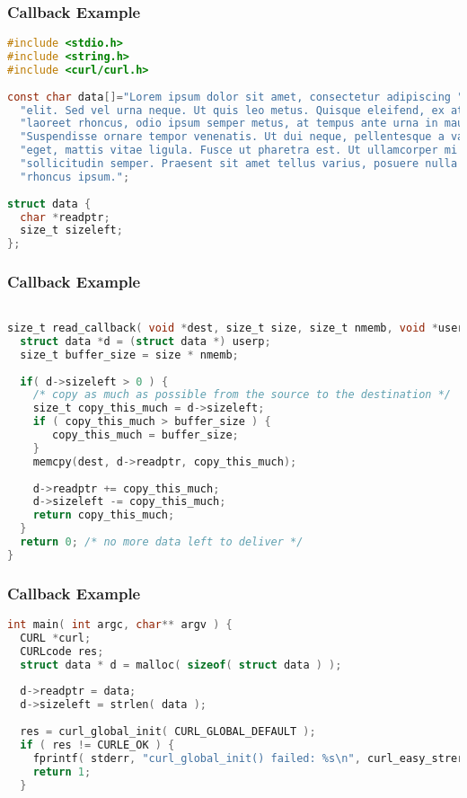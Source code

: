 \begin{frame}[fragile]
	\frametitle{Callback Example}

	\begin{lstlisting}[language=C]
#include <stdio.h>
#include <string.h>
#include <curl/curl.h>
  
const char data[]="Lorem ipsum dolor sit amet, consectetur adipiscing "
  "elit. Sed vel urna neque. Ut quis leo metus. Quisque eleifend, ex at "
  "laoreet rhoncus, odio ipsum semper metus, at tempus ante urna in mauris. "
  "Suspendisse ornare tempor venenatis. Ut dui neque, pellentesque a varius "
  "eget, mattis vitae ligula. Fusce ut pharetra est. Ut ullamcorper mi ac "
  "sollicitudin semper. Praesent sit amet tellus varius, posuere nulla non, "
  "rhoncus ipsum.";
 
struct data {
  char *readptr;
  size_t sizeleft;
};
\end{lstlisting}
\end{frame}

\begin{frame}[fragile]
	\frametitle{Callback Example}

	\begin{lstlisting}[language=C]

size_t read_callback( void *dest, size_t size, size_t nmemb, void *userp ) {
  struct data *d = (struct data *) userp;
  size_t buffer_size = size * nmemb;
 
  if( d->sizeleft > 0 ) {
    /* copy as much as possible from the source to the destination */ 
    size_t copy_this_much = d->sizeleft;
    if ( copy_this_much > buffer_size ) {
       copy_this_much = buffer_size;
    }
    memcpy(dest, d->readptr, copy_this_much);
 
    d->readptr += copy_this_much;
    d->sizeleft -= copy_this_much;
    return copy_this_much; 
  }
  return 0; /* no more data left to deliver */ 
}
\end{lstlisting}

\end{frame}



\begin{frame}[fragile]
	\frametitle{Callback Example}
	\begin{lstlisting}[language=C]
int main( int argc, char** argv ) {
  CURL *curl;
  CURLcode res;
  struct data * d = malloc( sizeof( struct data ) );
 
  d->readptr = data;
  d->sizeleft = strlen( data );
 
  res = curl_global_init( CURL_GLOBAL_DEFAULT );
  if ( res != CURLE_OK ) {
    fprintf( stderr, "curl_global_init() failed: %s\n", curl_easy_strerror( res ) );
    return 1;
  }
\end{lstlisting}

\end{frame}



